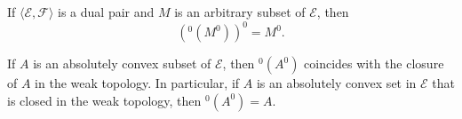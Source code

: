 If $\langle \mathcal{E}, \mathcal{F} \rangle$ is a dual pair and $M$ is an arbitrary subset of $\mathcal{E}$, then
$$(^0(M^0))^0 = M^0.$$

If $A$ is an absolutely convex subset of $\mathcal{E}$, then $^0(A^0)$ coincides with the closure of $A$ in the weak topology. In particular, if $A$ is an absolutely convex set in $\mathcal{E}$ that is closed in the weak topology, then $^0(A^0) = A$.
